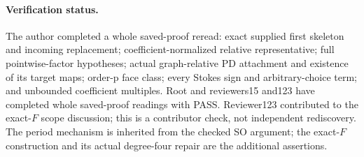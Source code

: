 \paragraph{Verification status.}
The author completed a whole saved-proof reread: exact supplied
first skeleton and incoming replacement; coefficient-normalized
relative representative; full pointwise-factor hypotheses; actual
graph-relative PD attachment and existence of its target maps;
order-p face class; every Stokes sign and arbitrary-choice
term; and unbounded coefficient multiples.  Root and reviewers15 and123 have completed whole saved-proof
readings with PASS.  Reviewer123 contributed to the exact-\(F\)
scope discussion; this is a contributor check, not independent
rediscovery.  The period mechanism is inherited from
the checked SO argument; the exact-\(F\) construction and
its actual degree-four repair are the additional assertions.
